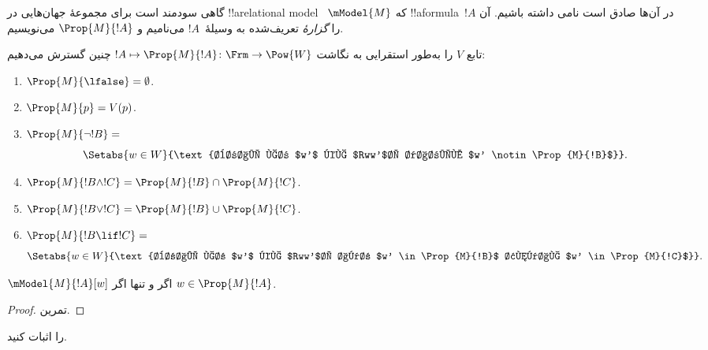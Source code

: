 \documentclass[../../../include/open-logic-section]{subfiles}
\begin{document}


گاهی سودمند است برای مجموعهٔ جهان‌هایی در !!a{relational model}
~$\mModel{M}$ که !!a{formula}~$!A$ در آن‌ها صادق است نامی داشته باشیم.
آن را \emph{گزارهٔ} تعریف‌شده به وسیلهٔ~$!A$ می‌نامیم و
$\Prop{M}{!A}$ می‌نویسیم.

\begin{defn}
  تابع $V$ را به‌طور استقرایی به نگاشت
  $!A \mapsto \Prop{M}{!A} \colon \Frm \to \Pow{W}$ چنین گسترش می‌دهیم:
  \begin{enumerate}
  \item $\Prop{M}{\lfalse} = \emptyset$.
  \item $\Prop{M}{p} = V(p)$.
  \item $\Prop{M}{\lnot !B} = {}$
    \[
      \Setabs{w \in W}{\text{برای هر $w'$ که $Rww'$، داریم
          $w' \notin \Prop{M}{!B}$}}.
    \]
  \item $\Prop{M}{!B \land !C} = \Prop{M}{!B} \cap \Prop{M}{!C}$.
  \item $\Prop{M}{!B \lor !C} = \Prop{M}{!B} \cup \Prop{M}{!C}$.
  \item $\Prop{M}{!B \lif !C} = {}$
    \[
      \Setabs{w \in W}{\text{برای هر $w'$ که $Rww'$، اگر
          $w' \in \Prop{M}{!B}$ آنگاه $w' \in \Prop{M}{!C}$}}.
    \]
  \end{enumerate}
\end{defn}

\begin{prop}
  $\mModel{M}{!A}[w]$ اگر و تنها اگر $w \in \Prop{M}{!A}$.
\end{prop}

\begin{proof}
  تمرین.
\end{proof}

\begin{prob}
   را اثبات کنید.
\end{prob}
\end{document}
